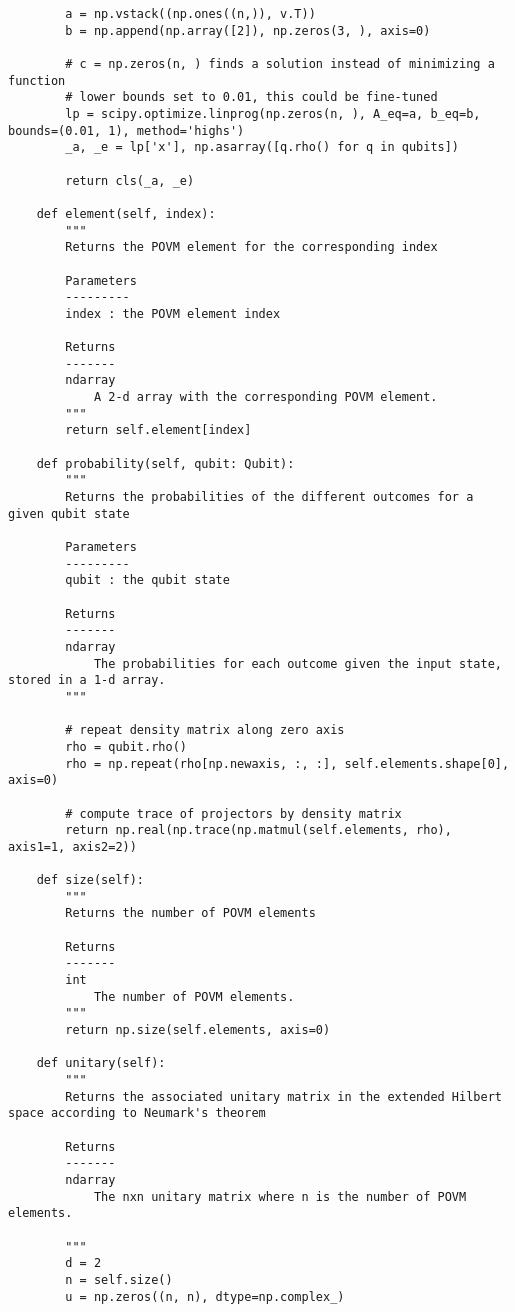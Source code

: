 \begin{verbatim}
        a = np.vstack((np.ones((n,)), v.T))
        b = np.append(np.array([2]), np.zeros(3, ), axis=0)

        # c = np.zeros(n, ) finds a solution instead of minimizing a function
        # lower bounds set to 0.01, this could be fine-tuned
        lp = scipy.optimize.linprog(np.zeros(n, ), A_eq=a, b_eq=b, bounds=(0.01, 1), method='highs')
        _a, _e = lp['x'], np.asarray([q.rho() for q in qubits])

        return cls(_a, _e)

    def element(self, index):
        """
        Returns the POVM element for the corresponding index

        Parameters
        ---------
        index : the POVM element index

        Returns
        -------
        ndarray
            A 2-d array with the corresponding POVM element.
        """
        return self.element[index]

    def probability(self, qubit: Qubit):
        """
        Returns the probabilities of the different outcomes for a given qubit state

        Parameters
        ---------
        qubit : the qubit state

        Returns
        -------
        ndarray
            The probabilities for each outcome given the input state, stored in a 1-d array.
        """

        # repeat density matrix along zero axis
        rho = qubit.rho()
        rho = np.repeat(rho[np.newaxis, :, :], self.elements.shape[0], axis=0)

        # compute trace of projectors by density matrix
        return np.real(np.trace(np.matmul(self.elements, rho), axis1=1, axis2=2))

    def size(self):
        """
        Returns the number of POVM elements

        Returns
        -------
        int
            The number of POVM elements.
        """
        return np.size(self.elements, axis=0)

    def unitary(self):
        """
        Returns the associated unitary matrix in the extended Hilbert space according to Neumark's theorem

        Returns
        -------
        ndarray
            The nxn unitary matrix where n is the number of POVM elements.

        """
        d = 2
        n = self.size()
        u = np.zeros((n, n), dtype=np.complex_)


\end{verbatim}
